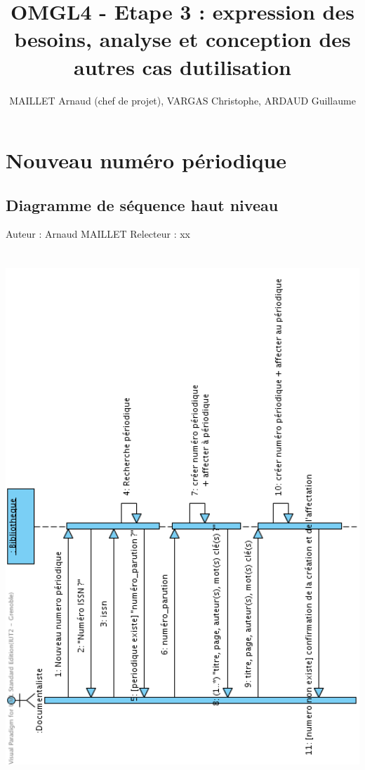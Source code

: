 \documentclass[a4paper,10pt]{report}
\title{OMGL4 - Etape 3 : expression des besoins, analyse et conception des autres cas dutilisation}
\author{MAILLET Arnaud (chef de projet), VARGAS Christophe, ARDAUD Guillaume}
\begin{document}
\maketitle
\newpage
\null
\newpage
\tableofcontents
\newpage
\null
\newpage

\centering

\chapter*{Nouveau numéro périodique}
\section*{Diagramme de séquence haut niveau}

Auteur : Arnaud MAILLET
Relecteur : xx

\bigskip
\includegraphics[height=200mm]{NouvPerHautNiveau.png}

\newpage
\end{document}
